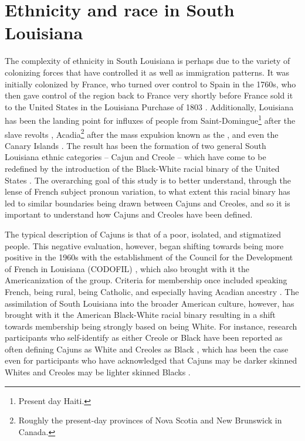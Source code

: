 \section{Ethnicity and race in South Louisiana}
  \label{sec:ethnicity_race}
  The complexity of ethnicity in South Louisiana is perhaps due to the variety of colonizing forces that have controlled it as well as immigration patterns.
  It was initially colonized by France, who turned over control to Spain in the 1760s, who then gave control of the region back to France very shortly before France sold it to the United States in the Louisiana Purchase of 1803 \parencite{fortier_french_1884, johnson_louisiana_1976, klingler_if_2003}.
  Additionally, Louisiana has been the landing point for influxes of people from Saint-Domingue\footnote{
    Present day Haiti.
  } after the slave revolts \parencite[Debien \& Le Gardeur, 1981, as cited in][]{klingler_if_2003}, Acadia\footnote{
    Roughly the present-day provinces of Nova Scotia and New Brunswick in Canada.
  } after the mass expulsion known as the  \parencite{fortier_french_1884, klingler_if_2003, neumann_creole_1985}, and even the Canary Islands \parencite{klingler_if_2003}.
  The result has been the formation of two general South Louisiana ethnic categories -- Cajun and Creole -- which have come to be redefined by the introduction of the Black-White racial binary of the United States \parencite{dajko_sociolinguistics_2012}.
  The overarching goal of this study is to better understand, through the lense of French subject pronoun variation, to what extent this racial binary has led to similar boundaries being drawn between Cajuns and Creoles, and so it is important to understand how Cajuns and Creoles have been defined.

    The typical description of Cajuns is that of a poor, isolated, and stigmatized people.
    This negative evaluation, however, began shifting towards being more positive in the 1960s with the establishment of the Council for the Development of French in Louisiana (CODOFIL) \parencite[pp.~31-33]{brown_pronominal_1988}, which also brought with it the Americanization of the group.
    Criteria for membership once included speaking French, being rural, being Catholic, and especially having Acadian ancestry \parencite{johnson_louisiana_1976, neumann_creole_1985, smith_influence_1939}.
    The assimilation of South Louisiana into the broader American culture, however, has brought with it the American Black-White racial binary resulting in a shift towards membership being strongly based on being White.
    For instance, research participants who self-identify as either Creole or Black have been reported as often defining Cajuns as White and Creoles as Black \parencite[p.~34]{giancarlo_dont_2019}, which has been the case even for participants who have acknowledged that Cajuns may be darker skinned Whites and Creoles may be lighter skinned Blacks \parencite[Stanford, 2016, as cited in][p.~32]{giancarlo_dont_2019}.

